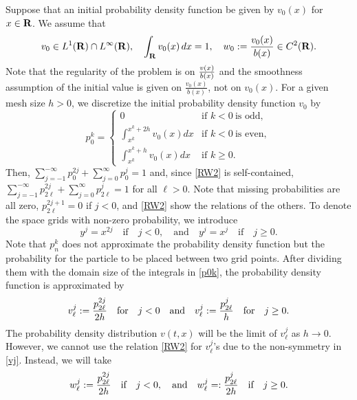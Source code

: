 \documentclass[11pt]{amsart}
\def\R{{\bf R}}
\def\R{{\bf R}}
\begin{document}
Suppose that an initial probability density function be given by $v_0(x)$ for $x\in\R$. We assume that
\begin{equation} \label{initial}
 v_0 \in L^1( \R)\cap L^\infty(\R), \quad \int_ \R v_0(x)\, dx = 1, \quad
 w_0:=\frac{v_0(x)}{ b(x)} \in C^2(\R).
\end{equation}
Note that the regularity of the problem is on ${v(x)\over b(x)}$ and the smoothness assumption of the initial value is given on $\frac{v_0(x)}{ b(x)}$, not on $v_0(x)$. For a given mesh size $h>0$, we discretize the initial probability density function $v_0$ by
\begin{equation}\label{p0k}
p_{0}^{k} = \left\{\begin{array}{ll}
               0 & \text{if } k<0\ \text{is odd},\\
               \int_{x^k}^{x^{k}+2h} v_0(x)dx & \text{if } k<0\ \text{is
               even},\\
                \int_{x^k}^{x^{k}+h} v_0(x)dx  & \text{if } k\ge0.
               \end{array}\right.
\end{equation}
Then, $\sum_{j=-1}^{-\infty}p_{0}^{2j}+\sum_{j=0}^{\infty}p_{0}^{j}=1$ and, since \eqref{RW2} is self-contained, $\sum_{j=-1}^{-\infty}p_{2\ell}^{2j}+\sum_{j=0}^{\infty}p_{2\ell}^{j}=1$ for all $\ell>0$. Note that missing probabilities are all zero, $p_{2\ell}^{2j+1}=0$ if $j<0$, and \eqref{RW2} show the relations of the others. To denote the space grids with non-zero probability, we introduce
\begin{equation}\label{yj}
y^j=x^{2j}\quad\text{if}\quad j<0,\quad\text{and}\quad
y^j=x^{j}\quad\text{if}\quad j\ge0.
\end{equation}
Note that $p_{n}^{k}$ does not approximate the probability density function but the probability for the particle to be placed between two grid points. After dividing them with the domain size of the integrals in \eqref{p0k}, the probability density function is approximated by
\begin{equation}\label{vj}
v^{j}_\ell:={p^{2j}_{2\ell} \over2h}\quad\text{for}\quad
j<0\quad\text{and}
\quad v^{j}_\ell:={p_{2\ell}^{j}\over h}\quad\text{for}\quad j\ge0.
\end{equation}
The probability density distribution $v(t,x)$ will be the limit of $v^j_\ell$ as $h\to0$. However, we cannot use the relation \eqref{RW2} for $v^{j}_\ell$'s due to the non-symmetry in \eqref{vj}. Instead, we will take
\begin{equation}\label{pandw}
w^{j}_\ell:={p_{2\ell}^{2j}\over2h}\quad\text{if}\quad j<0,\quad\text
{and} \quad w^{j}_\ell=:{p_{2\ell}^{j}\over2h}\quad\text{if}\quad j\ge0.
\end{equation}
\end{document}
